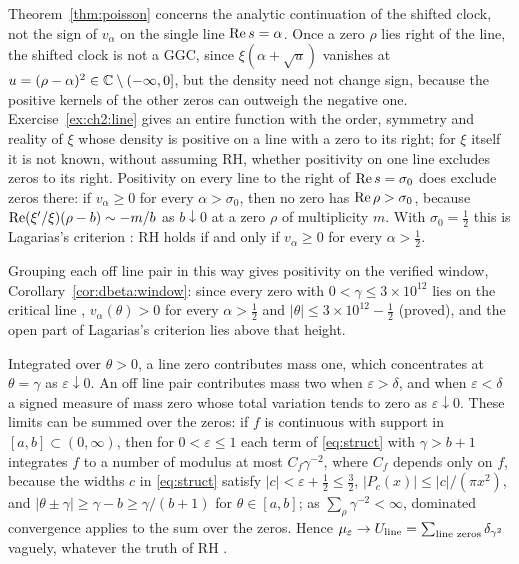\begin{remark}\label{rem:ch2:oneline}
Theorem~\ref{thm:poisson} concerns the analytic continuation of the shifted clock, not the sign of $v_\alpha$ on the single line $\operatorname{Re} s=\alpha$. Once a zero $\rho$ lies right of the line, the shifted clock is not a GGC, since $\xi(\alpha+\sqrt u)$ vanishes at $u=(\rho-\alpha)^2\in\mathbb{C}\setminus(-\infty,0]$, but the density need not change sign, because the positive kernels of the other zeros can outweigh the negative one. Exercise~\ref{ex:ch2:line} gives an entire function with the order, symmetry and reality of $\xi$ whose density is positive on a line with a zero to its right; for $\xi$ itself it is not known, without assuming RH, whether positivity on one line excludes zeros to its right. Positivity on every line to the right of $\operatorname{Re} s=\sigma_0$ does exclude zeros there: if $v_\alpha\ge0$ for every $\alpha>\sigma_0$, then no zero has $\operatorname{Re}\rho>\sigma_0$, because $\operatorname{Re}(\xi'/\xi)(\rho-b)\sim-m/b$ as $b\downarrow0$ at a zero $\rho$ of multiplicity $m$. With $\sigma_0=\frac12$ this is Lagarias's criterion \cite{Lagarias}: RH holds if and only if $v_\alpha\ge0$ for every $\alpha>\frac12$.
\end{remark}

Grouping each off line pair in this way gives positivity on the verified window, Corollary~\ref{cor:dbeta:window}: since every zero with $0<\gamma\le3\times10^{12}$ lies on the critical line \cite{PT21}, $v_\alpha(\theta)>0$ for every $\alpha>\frac12$ and $|\theta|\le3\times10^{12}-\frac12$ (proved), and the open part of Lagarias's criterion lies above that height.

Integrated over $\theta>0$, a line zero contributes mass one, which concentrates at $\theta=\gamma$ as $\varepsilon\downarrow0$. An off line pair contributes mass two when $\varepsilon>\delta$, and when $\varepsilon<\delta$ a signed measure of mass zero whose total variation tends to zero as $\varepsilon\downarrow0$. These limits can be summed over the zeros: if $f$ is continuous with support in $[a,b]\subset(0,\infty)$, then for $0<\varepsilon\le1$ each term of \eqref{eq:struct} with $\gamma>b+1$ integrates $f$ to a number of modulus at most $C_f\gamma^{-2}$, where $C_f$ depends only on $f$, because the widths $c$ in \eqref{eq:struct} satisfy $|c|<\varepsilon+\frac12\le\frac32$, $|P_c(x)|\le|c|/(\pi x^2)$, and $|\theta\pm\gamma|\ge\gamma-b\ge\gamma/(b+1)$ for $\theta\in[a,b]$; as $\sum_\rho\gamma^{-2}<\infty$, dominated convergence applies to the sum over the zeros. Hence $\mu_\varepsilon\to U_{\rm line}=\sum_{\text{line zeros}}\delta_{\gamma^2}$ vaguely, whatever the truth of RH \cite[Proposition 9.5]{P17}.


